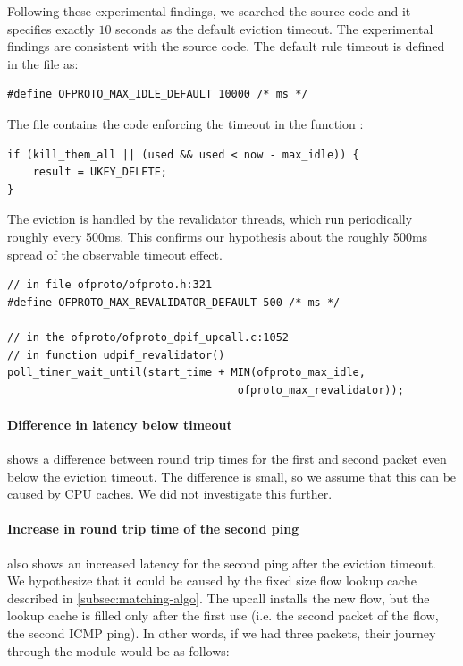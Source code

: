 Following these experimental findings, we searched the source code and it specifies exactly $10$ seconds as the default eviction timeout. The experimental findings are consistent with the source code. The default rule timeout is defined in the file  as:
\begin{verbatim}
#define OFPROTO_MAX_IDLE_DEFAULT 10000 /* ms */
\end{verbatim}

The file  contains the code enforcing the timeout in the function :

\begin{verbatim}
if (kill_them_all || (used && used < now - max_idle)) {
    result = UKEY_DELETE;
}
\end{verbatim}

The eviction is handled by the revalidator threads, which run periodically roughly every 500ms. This confirms our hypothesis about the roughly 500ms spread of the observable timeout effect.

\begin{verbatim}
// in file ofproto/ofproto.h:321
#define OFPROTO_MAX_REVALIDATOR_DEFAULT 500 /* ms */

// in the ofproto/ofproto_dpif_upcall.c:1052
// in function udpif_revalidator()
poll_timer_wait_until(start_time + MIN(ofproto_max_idle,
                                    ofproto_max_revalidator));
\end{verbatim}

\paragraph{Difference in latency below timeout}
 shows a difference between round trip times for the first and second packet even below the eviction timeout. The difference is small, so we assume that this can be caused by CPU caches. We did not investigate this further.

\paragraph{Increase in round trip time of the second ping}
 also shows an increased latency for the second ping after the eviction timeout. We hypothesize that it could be caused by the fixed size flow lookup cache described in \cref{subsec:matching-algo}. The upcall installs the new flow, but the lookup cache is filled only after the first use (i.e. the second packet of the flow, the second ICMP ping). In other words, if we had three packets, their journey through the  module would be as follows:

